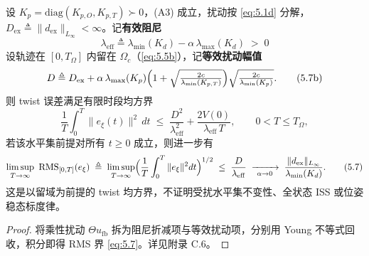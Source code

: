 \renewcommand{\thetheorem}{3(d)}%
\begin{theorem}\label{thm:3d}
设 $K_p=\mathrm{diag}(K_{p,O},K_{p,T})\succ0$，(A3) 成立，扰动按 \eqref{eq:5.1d} 分解，$D_{\mathrm{ex}}\triangleq\|d_{\mathrm{ex}}\|_{L_\infty}<\infty$。记\textbf{有效阻尼}
\begin{equation}
\lambda_{\mathrm{eff}}\triangleq\lambda_{\min}(K_d)-\alpha\,\lambda_{\max}(K_d)\;>\;0
\tag{5.7a}\label{eq:5.7a}
\end{equation}
设轨迹在 $[0,T_\Omega]$ 内留在 $\Omega_c$（\eqref{eq:5.5b}），记\textbf{等效扰动幅值}
\begin{equation}
D\triangleq D_{\mathrm{ex}}+\alpha\,\lambda_{\max}(K_p)\Bigl(1+\sqrt{\tfrac{2c}{\lambda_{\min}(K_{p,T})}}\Bigr)\sqrt{\tfrac{2c}{\lambda_{\min}(K_p)}} .
\tag{5.7b}\label{eq:5.7b}
\end{equation}
则 twist 误差满足有限时段均方界
\begin{equation}
\frac1T\int_0^T\|e_\xi(t)\|^2\,dt\;\le\;\frac{D^2}{\lambda_{\mathrm{eff}}^2}+\frac{2V(0)}{\lambda_{\mathrm{eff}}\,T},
\qquad 0<T\le T_\Omega,
\tag{5.7c}\label{eq:5.7c}
\end{equation}
若该水平集前提对所有 $t\ge0$ 成立，则进一步有
\begin{equation}
\limsup_{T\to\infty}\ \mathrm{RMS}_{[0,T]}(e_\xi)
\;\triangleq\;\limsup_{T\to\infty}\Bigl(\frac1T\int_0^T\|e_\xi\|^2dt\Bigr)^{1/2}
\;\le\;\frac{D}{\lambda_{\mathrm{eff}}}
\;\xrightarrow[\ \alpha\to0\ ]{}\;\frac{\|d_{\mathrm{ex}}\|_{L_\infty}}{\lambda_{\min}(K_d)} .
\tag{5.7}\label{eq:5.7}
\end{equation}
这是以留域为前提的 twist 均方界，不证明受扰水平集不变性、全状态 ISS 或位姿稳态标度律。
\end{theorem}

\begin{proof}
将乘性扰动 $\Theta u_{\mathrm{fb}}$ 拆为阻尼折减项与等效扰动项，分别用 Young 不等式回收，积分即得 RMS 界 \eqref{eq:5.7}。详见附录 C.6。
\end{proof}
